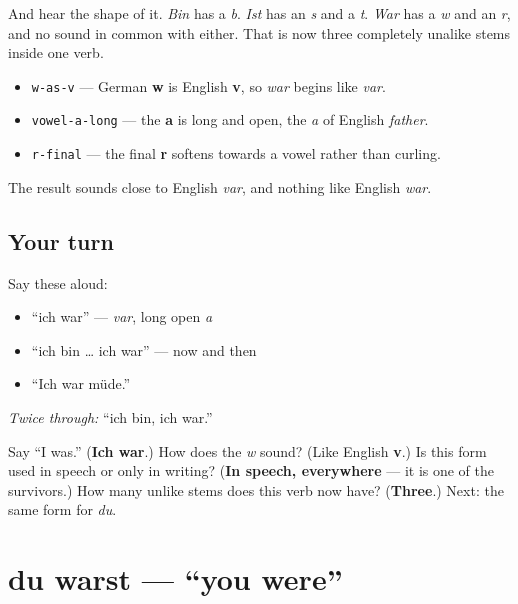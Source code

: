 And hear the shape of it. \emph{Bin} has a \emph{b}. \emph{Ist} has an \emph{s} and a \emph{t}. \emph{War} has a \emph{w} and an \emph{r}, and no sound in common with either. That is now three completely unalike stems inside one verb.

\begin{sounds}
\begin{itemize}
\raggedright
  \item \texttt{w-as-v} — German \textbf{w} is English \textbf{v}, so \emph{war} begins like \emph{var}.
  \item \texttt{vowel-a-long} — the \textbf{a} is long and open, the \emph{a} of English \emph{father}.
  \item \texttt{r-final} — the final \textbf{r} softens towards a vowel rather than curling.
\end{itemize}

The result sounds close to English \emph{var}, and nothing like English \emph{war}.
\end{sounds}

\subsection*{Your turn}
Say these aloud:

\begin{itemize}
\raggedright
  \item \textquotedblleft{}ich war\textquotedblright{} — \emph{var}, long open \emph{a}
  \item \textquotedblleft{}ich bin … ich war\textquotedblright{} — now and then
  \item \textquotedblleft{}Ich war müde.\textquotedblright{}
\end{itemize}

\emph{Twice through:} \textquotedblleft{}ich bin, ich war.\textquotedblright{}

\begin{tcolorbox}[breakable,colback=teal!4,colframe=teal!35!black,title={Before you move on}]
Say \textquotedblleft{}I was.\textquotedblright{} (\textbf{Ich war}.) How does the \emph{w} sound? (Like English \textbf{v}.) Is this form used in speech or only in writing? (\textbf{In speech, everywhere} — it is one of the survivors.) How many unlike stems does this verb now have? (\textbf{Three}.) Next: the same form for \emph{du}.
\end{tcolorbox}
\section[du warst]{du warst — \textquotedblleft{}you were\textquotedblright{}}


